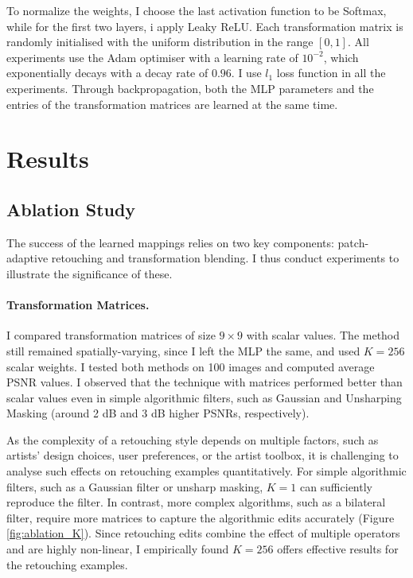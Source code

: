 To normalize the weights, I choose the last activation function to be Softmax, while for the first two layers, i apply Leaky ReLU. Each transformation matrix is randomly initialised with the uniform distribution in the range $[0, 1]$. All experiments use the Adam optimiser with a learning rate of $10^{-2}$, which exponentially decays with a decay rate of $0.96$. I use $l_1$ loss function in all the experiments. Through backpropagation, both the MLP parameters and the entries of the transformation matrices are learned at the same time.

\section{Results}
\label{sec:results}


\subsection{Ablation Study}\label{ablation}
The success of the learned mappings relies on two key components: patch-adaptive retouching and transformation blending. I thus conduct experiments to illustrate the significance of these.

\paragraph{Transformation Matrices.} I compared transformation matrices of size $9 \times 9$ with scalar values. The method still remained spatially-varying, since I left the MLP the same, and used $K=256$ scalar weights. I tested both methods on 100 images and computed average PSNR values. I observed that the technique with matrices performed better than scalar values even in simple algorithmic filters, such as Gaussian and Unsharping Masking (around 2 dB and 3 dB higher PSNRs, respectively). 

As the complexity of a retouching style depends on multiple factors, such as artists’ design choices, user preferences, or the artist toolbox, it is challenging to analyse such effects on retouching examples quantitatively. For simple algorithmic filters, such as a Gaussian filter or unsharp masking, $K=1$ can sufficiently reproduce the filter. In contrast, more complex algorithms, such as a bilateral filter, require more matrices to capture the algorithmic edits accurately (Figure \ref{fig:ablation_K}). Since retouching edits combine the effect of multiple operators and are highly non-linear, I empirically found $K=256$ offers effective results for the retouching examples. 

